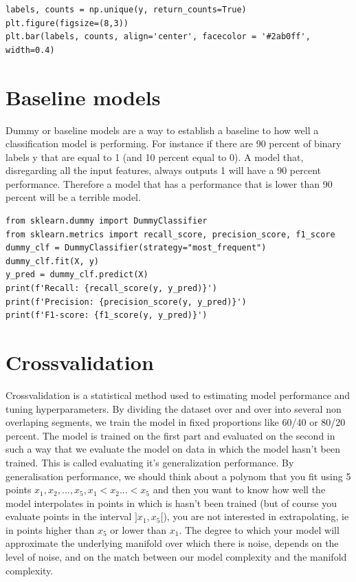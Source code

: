 \documentclass[24pt]{article}
\begin{document}
\begin{lstlisting}
labels, counts = np.unique(y, return_counts=True)
plt.figure(figsize=(8,3)) 
plt.bar(labels, counts, align='center', facecolor = '#2ab0ff', width=0.4)
\end{lstlisting}




\section{Baseline models}
  
  Dummy or baseline models are a way to establish a baseline to how well a classification model is performing. For instance if there are 90 percent of binary labels y that are equal to 1 (and 10 percent equal to 0). A model that, disregarding all the input features,  always outputs 1 will have a 90 percent performance. Therefore a model that has a performance that is lower than 90 percent will be a terrible model.
    
\begin{lstlisting}
from sklearn.dummy import DummyClassifier
from sklearn.metrics import recall_score, precision_score, f1_score
dummy_clf = DummyClassifier(strategy="most_frequent")
dummy_clf.fit(X, y)
y_pred = dummy_clf.predict(X)
print(f'Recall: {recall_score(y, y_pred)}')
print(f'Precision: {precision_score(y, y_pred)}')
print(f'F1-score: {f1_score(y, y_pred)}')
\end{lstlisting}  

\section{Crossvalidation}

Crossvalidation is a statistical method used to estimating model performance and tuning hyperparameters. 
By dividing the dataset over and over into several non overlaping segments, we train the model in fixed proportions like 60/40 or 80/20 percent. The model is trained on the first part and evaluated on the second in such a way that we evaluate the model on data in which the model hasn't been trained. This is called  evaluating it's generalization performance. 
By generalisation performance, we should think about a polynom that you fit using 5 points $x_1, x_2, ..., x_5, x_1 < x_2 ... < x_5$ and then you want to know how well the model interpolates  in points in which is hasn't been trained (but of course you evaluate points in the interval $]x_1, x_5[$), you are not interested in extrapolating, ie in points higher than $x_5$ or lower than $x_1$. The degree to which your model will approximate the underlying manifold over which there is noise, depends on the level of noise, and on the match between our model complexity and the manifold complexity.
\end{document}

